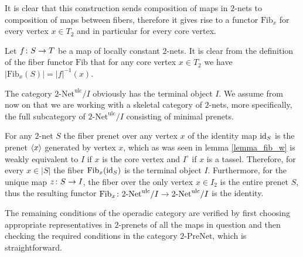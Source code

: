 \documentclass[letterpaper,12pt,leqno]{article}
\numberwithin{equation}{theorem}
\def\Fib{\mathrm{Fib}}
\def\Net{\textrm{-}\mathrm{Net}}
\def\PreNet{\textrm{-}\mathrm{PreNet}}
\def\simo{\,\mathop{\sim}\limits^\circ\,}
\def\ulc{\mathrm{ulc}}
\begin{document}
\begin{nparagraph}

It is clear that this construction sends composition of maps in $2$-nets to composition of maps between fibers, therefore it gives rise to a functor $\Fib_x$
for every vertex $x \in T_2$ and in particular for every core vertex.

\end{nparagraph}

\begin{nparagraph}
Let $f\colon S \to T$ be a map of locally constant $2$-nets. It is clear from the definition of the fiber functor $\Fib$ that for any core vertex $x \in T_2$
we have $|\Fib_x(S)| = |f|^{-1}(x)$.

The category $2\Net^\ulc / I$ obviously has the terminal object $I$. We assume from now on that we are working with a skeletal category of $2$-nets,
more specifically, the full subcategory of $2\Net^\ulc / I$ consisting of minimal prenets.

For any $2$-net $S$ the fiber prenet over any vertex $x$ of the identity map $\mathrm{id}_S$ is the prenet $\left<x\right>$ generated by vertex $x$, which as was seen in lemma \ref{lemma_fib_w}
is weakly equivalent to $I$ if $x$ is the core vertex and $I^\circ$ if $x$ is a tassel. Therefore, for every $x \in |S|$ the fiber $\Fib_x(\id_S)$ is the terminal object $I$.
Furthermore, for the unique map $z\colon S \to I$, the fiber over the only vertex $x \in I_2$ is the entire prenet $S$, thus the resulting functor
$\Fib_x \from 2\Net^\ulc / I \to 2\Net^\ulc / I$ is the identity.

The remaining conditions of the operadic category are verified by first choosing appropriate representatives in $2$-prenets of all the maps in question and then checking the
required conditions in the category $2\PreNet$, which is straightforward.

\end{nparagraph}
\end{document}
